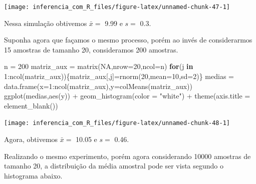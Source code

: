 \documentclass[
]{book}
\newenvironment{Shaded}{\begin{snugshade}}{\end{snugshade}}
\newcommand{\AttributeTok}[1]{\textcolor[rgb]{0.77,0.63,0.00}{#1}}
\newcommand{\ConstantTok}[1]{\textcolor[rgb]{0.00,0.00,0.00}{#1}}
\newcommand{\ControlFlowTok}[1]{\textcolor[rgb]{0.13,0.29,0.53}{\textbf{#1}}}
\newcommand{\DecValTok}[1]{\textcolor[rgb]{0.00,0.00,0.81}{#1}}
\newcommand{\FunctionTok}[1]{\textcolor[rgb]{0.00,0.00,0.00}{#1}}
\newcommand{\NormalTok}[1]{#1}
\newcommand{\OtherTok}[1]{\textcolor[rgb]{0.56,0.35,0.01}{#1}}
\newcommand{\SpecialCharTok}[1]{\textcolor[rgb]{0.00,0.00,0.00}{#1}}
\newcommand{\StringTok}[1]{\textcolor[rgb]{0.31,0.60,0.02}{#1}}
\begin{document}
\begin{center}\texttt{[image: inferencia\_com\_R\_files/figure-latex/unnamed-chunk-47-1]} \end{center}

Nessa simulação obtivemos \(\bar x =\) 9.99 e \(s =\) 0.3.

Suponha agora que façamos o mesmo processo, porém ao invés de considerarmos 15 amostras de tamanho 20, consideramos 200 amostras.

\begin{Shaded}
\begin{Highlighting}[]
\NormalTok{n }\OtherTok{=} \DecValTok{200}
\NormalTok{matriz\_aux }\OtherTok{=} \FunctionTok{matrix}\NormalTok{(}\ConstantTok{NA}\NormalTok{,}\AttributeTok{nrow=}\DecValTok{20}\NormalTok{,}\AttributeTok{ncol=}\NormalTok{n)}
\ControlFlowTok{for}\NormalTok{(j }\ControlFlowTok{in} \DecValTok{1}\SpecialCharTok{:}\FunctionTok{ncol}\NormalTok{(matriz\_aux))\{matriz\_aux[,j]}\OtherTok{=}\FunctionTok{rnorm}\NormalTok{(}\DecValTok{20}\NormalTok{,}\AttributeTok{mean=}\DecValTok{10}\NormalTok{,}\AttributeTok{sd=}\DecValTok{2}\NormalTok{)\}}
\NormalTok{medias }\OtherTok{=} \FunctionTok{data.frame}\NormalTok{(}\AttributeTok{x=}\DecValTok{1}\SpecialCharTok{:}\FunctionTok{ncol}\NormalTok{(matriz\_aux),}\AttributeTok{y=}\FunctionTok{colMeans}\NormalTok{(matriz\_aux))}
\FunctionTok{ggplot}\NormalTok{(medias,}\FunctionTok{aes}\NormalTok{(y)) }\SpecialCharTok{+}
  \FunctionTok{geom\_histogram}\NormalTok{(}\AttributeTok{color =} \StringTok{"white"}\NormalTok{) }\SpecialCharTok{+}
  \FunctionTok{theme}\NormalTok{(}\AttributeTok{axis.title =} \FunctionTok{element\_blank}\NormalTok{())}
\end{Highlighting}
\end{Shaded}

\begin{center}\texttt{[image: inferencia\_com\_R\_files/figure-latex/unnamed-chunk-48-1]} \end{center}

Agora, obtivemos \(\bar x =\) 10.05 e \(s =\) 0.46.

Realizando o mesmo experimento, porém agora considerando 10000 amostras de tamanho 20, a distribuição da média amostral pode ser vista segundo o histograma abaixo.
\end{document}

